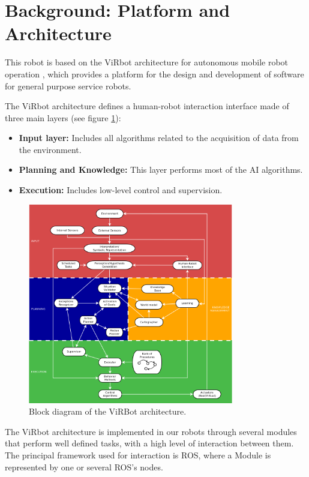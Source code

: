 \documentclass{llncs}
\begin{document}

\section{Background: Platform and Architecture}\label{sec:background}

This robot is based on the ViRbot architecture for autonomous mobile robot operation \cite{virbot}, which provides a platform for the design and development of software for general purpose service robots. 

The ViRbot architecture defines a human-robot interaction interface made of three main layers (see figure \ref{fig:virbot}):

\begin{itemize}
	\item \textbf{Input layer:} Includes all algorithms related to the acquisition of data from the environment. 
	\item \textbf{Planning and Knowledge:} This layer performs most of the AI algorithms.
	\item \textbf{Execution:} Includes low-level control and supervision. 
\end{itemize}

\begin{figure}[h]
	\centering
	\includegraphics[width=0.8\textwidth]{Figures/ViRBot.png}
	\caption{Block diagram of the ViRBot architecture.}
	\label{fig:virbot}
\end{figure}

The ViRbot architecture is implemented in our robots through several modules that perform well defined tasks, with a high level of interaction between them. The principal framework used for interaction is ROS, where a Module is represented by one or several ROS's nodes.
\end{document}

